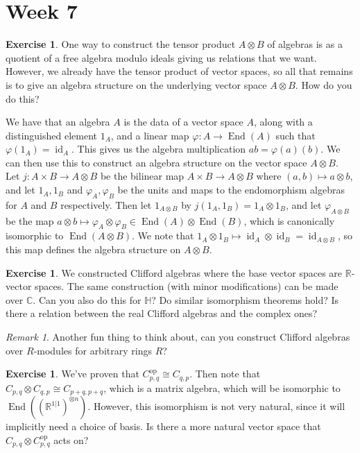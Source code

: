 \documentclass[psamsfonts]{amsart}
\theoremstyle{definition}
\newtheorem{exer}[thm]{Exercise}
\theoremstyle{remark}
\newtheorem*{rem*}{Remark}
\newcommand{\R}{\mathbb{R}}
\newcommand{\C}{\mathbb{C}}
\DeclareMathOperator{\id}{id}
\DeclareMathOperator{\End}{End}
\begin{document}
\section*{Week 7}
%
\begin{exer}
One way to construct the tensor product $A \otimes B$ of algebras is as a quotient of a free algebra modulo ideals giving us relations that we want. However, we already have the tensor product of vector spaces, so all that remains is to give an algebra structure on the underlying vector space $A \otimes B$. How do you do this?
\end{exer}
We have that an algebra $A$ is the data of a vector space $A$, along with a distinguished element $1_A$, and a linear map $\varphi : A \to \End(A)$ such that $\varphi(1_A) = \id_A$. This gives us the algebra multiplication $ab = \varphi(a)(b)$. We can then use this to construct an algebra structure on the vector space $A \otimes B$. Let $j : A \times B \to A \otimes B$ be the bilinear map $A \times B \to A \otimes B$ where $(a,b) \mapsto a \otimes b$, and let $1_A,1_B$ and $\varphi_A,\varphi_B$ be the units and maps to the endomorphism algebras for $A$ and $B$ respectively. Then let $1_{A \otimes B}$ by $j(1_A, 1_B) = 1_A \otimes 1_B$, and let $\varphi_{A \otimes B}$ be the map $a \otimes b \mapsto \varphi_A \otimes \varphi_B \in \End(A) \otimes \End(B)$, which is canonically isomorphic to $\End(A \otimes B)$. We note that $1_A \otimes 1_B \mapsto \id_A \otimes \id_B = \id_{A \otimes B}$, so this map defines the algebra structure on $A \otimes B$.
%
\begin{exer}
We constructed Clifford algebras where the base vector spaces are $\R$-vector spaces. The same construction (with minor modifications) can be made over $\C$. Can you also do this for $\mathbb{H}$? Do similar isomorphism theorems hold? Is there a relation between the real Clifford algebras and the complex ones?
\end{exer}
\begin{rem*}
Another fun thing to think about, can you construct Clifford algebras over $R$-modules for arbitrary rings $R$?
\end{rem*}
%
\begin{exer}
We've proven that $C_{p,q}^{\text{op}} \cong C_{q,p}$. Then note that $C_{p,q} \otimes C_{q,p} \cong C_{p + q, p + q}$, which is a matrix algebra, which will be isomorphic to $\End((\R^{1|1})^{\otimes n})$. However, this isomorphism is not very natural, since it will implicitly need a choice of basis. Is there a more natural vector space that $C_{p,q} \otimes C^\text{op}_{p,q}$ acts on?
\end{exer}
\end{document}
